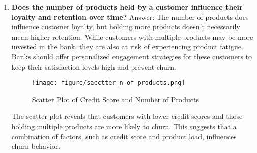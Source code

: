 \documentclass[12pt]{article}
\begin{document}
\begin{enumerate}
    \item \textbf{Does the number of products held by a customer influence their loyalty and retention over time?}
    Answer: The number of products does influence customer loyalty, but holding more products doesn't necessarily mean higher retention. While customers with multiple products may be more invested in the bank, they are also at risk of experiencing product fatigue. Banks should offer personalized engagement strategies for these customers to keep their satisfaction levels high and prevent churn.
    
    \begin{figure}[h]
        \vspace{5pt}
        \centering
        \texttt{[image: figure/sacctter\_n-of products.png]}  
        \caption{Scatter Plot of Credit Score and Number of Products}
            \label{fig:example1}
       \vspace{0.1cm}
    \end{figure}

    The scatter plot reveals that customers with lower credit scores and those holding multiple products are more likely to churn. This suggests that a combination of factors, such as credit score and product load, influences churn behavior.
    
\end{enumerate}

\newpage
\end{document}

